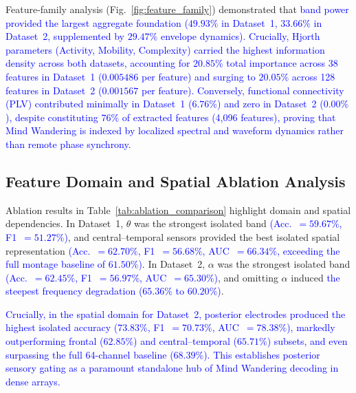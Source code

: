 \documentclass[conference]{IEEEtran}
\begin{document}
Feature-family analysis (Fig.~\ref{fig:feature_family}) demonstrated that \textcolor{blue}{band power provided the largest aggregate foundation ($49.93\%$ in Dataset~1, $33.66\%$ in Dataset~2, supplemented by $29.47\%$ envelope dynamics). Crucially, Hjorth parameters (Activity, Mobility, Complexity) carried the highest information density across both datasets, accounting for $20.85\%$ total importance across 38 features in Dataset~1 ($0.005486$ per feature) and surging to $20.05\%$ across 128 features in Dataset~2 ($0.001567$ per feature). Conversely, functional connectivity (PLV) contributed minimally in Dataset~1 ($6.76\%$) and zero in Dataset~2 ($0.00\%$), despite constituting $76\%$ of extracted features (4,096 features), proving that Mind Wandering is indexed by localized spectral and waveform dynamics rather than remote phase synchrony.}



\subsection{Feature Domain and Spatial Ablation Analysis}

Ablation results in Table~\ref{tab:ablation_comparison} highlight domain and spatial dependencies. In Dataset~1, $\theta$ was the strongest isolated band \textcolor{blue}{(Acc.~$=59.67\%$, F1~$=51.27\%$)}, and central--temporal sensors provided the best isolated spatial representation \textcolor{blue}{(Acc.~$=62.70\%$, F1~$=56.68\%$, AUC~$=66.34\%$, exceeding the full montage baseline of $61.50\%$)}. In Dataset~2, $\alpha$ was the strongest isolated band \textcolor{blue}{(Acc.~$=62.45\%$, F1~$=56.97\%$, AUC~$=65.30\%$)}, and omitting $\alpha$ induced \textcolor{blue}{the steepest frequency degradation ($65.36\%$ to $60.20\%$)}.

\textcolor{blue}{Crucially, in the spatial domain for Dataset~2, posterior electrodes produced the highest isolated accuracy ($73.83\%$, F1~$=70.73\%$, AUC~$=78.38\%$), markedly outperforming frontal ($62.85\%$) and central--temporal ($65.71\%$) subsets, and even surpassing the full 64-channel baseline ($68.39\%$). This establishes posterior sensory gating as a paramount standalone hub of Mind Wandering decoding in dense arrays.}
\end{document}
